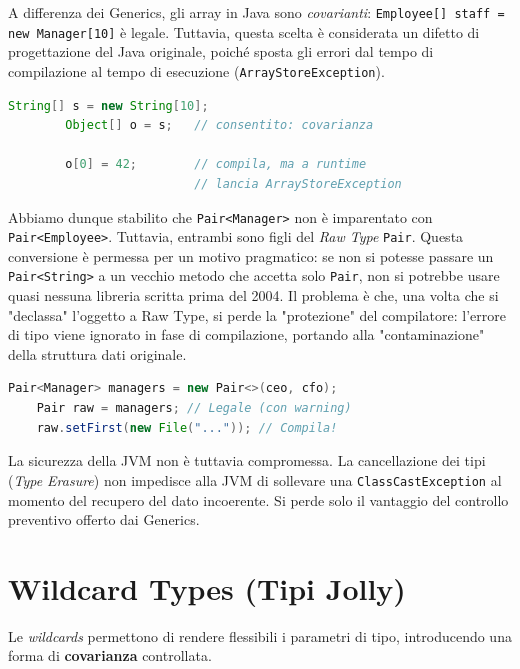 \begin{dettagli}
    A differenza dei Generics, gli array in Java sono \textit{covarianti}: \texttt{Employee[] staff = new Manager[10]} è legale. Tuttavia, questa scelta è considerata un difetto di progettazione del Java originale, poiché sposta gli errori dal tempo di compilazione al tempo di esecuzione (\texttt{ArrayStoreException}).
    \begin{lstlisting}[language=Java]
        String[] s = new String[10];
        Object[] o = s;   // consentito: covarianza

        o[0] = 42;        // compila, ma a runtime 
                          // lancia ArrayStoreException
    \end{lstlisting}
\end{dettagli}

Abbiamo dunque stabilito che \texttt{Pair<Manager>} non è imparentato con \texttt{Pair<Employee>}. Tuttavia, entrambi sono figli del \textit{Raw Type} \texttt{Pair}. Questa conversione è permessa per un motivo pragmatico: se non si potesse passare un \texttt{Pair<String>} a un vecchio metodo che accetta solo \texttt{Pair}, non si potrebbe usare quasi nessuna libreria scritta prima del 2004. Il problema è che, una volta che si "declassa" l'oggetto a Raw Type, si perde la "protezione" del compilatore: l'errore di tipo viene ignorato in fase di compilazione, portando alla "contaminazione" della struttura dati originale.

\begin{lstlisting}[language=Java]
    Pair<Manager> managers = new Pair<>(ceo, cfo);
    Pair raw = managers; // Legale (con warning)
    raw.setFirst(new File("...")); // Compila!
\end{lstlisting}  

La sicurezza della JVM non è tuttavia compromessa. La cancellazione dei tipi (\textit{Type Erasure}) non impedisce alla JVM di sollevare una \texttt{ClassCastException} al momento del recupero del dato incoerente. Si perde solo il vantaggio del controllo preventivo offerto dai Generics.

\section{Wildcard Types (Tipi Jolly)}

Le \textit{wildcards} permettono di rendere flessibili i parametri di tipo, introducendo una forma di \textbf{covarianza} controllata.

